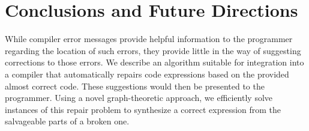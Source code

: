 \section{Conclusions and Future Directions}
\label{sec:concl}
While compiler error messages provide helpful information to the programmer regarding the location of such errors, they provide little in the way of suggesting corrections to those errors. We describe an algorithm suitable for integration into a compiler that automatically repairs code expressions based on the provided almost correct code. These suggestions would then be presented to the programmer. Using a novel graph-theoretic approach, we efficiently solve instances of this repair problem to synthesize a correct expression from the salvageable parts of a broken one.
